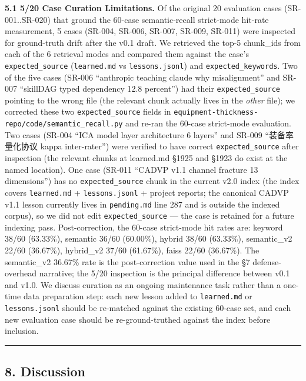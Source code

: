 \textbf{5.1 5/20 Case Curation Limitations.} Of the original 20
evaluation cases (SR-001..SR-020) that ground the 60-case
semantic-recall strict-mode hit-rate measurement, 5 cases (SR-004,
SR-006, SR-007, SR-009, SR-011) were inspected for ground-truth drift
after the v0.1 draft. We retrieved the top-5 chunk\_ids from each of the
6 retrieval modes and compared them against the case's
\texttt{expected\_source} (\texttt{learned.md} vs
\texttt{lessons.jsonl}) and \texttt{expected\_keywords}. Two of the five
cases (SR-006 ``anthropic teaching claude why misalignment'' and SR-007
``skillDAG typed dependency 12.8 percent'') had their
\texttt{expected\_source} pointing to the wrong file (the relevant chunk
actually lives in the \emph{other} file); we corrected these two
\texttt{expected\_source} fields in
\texttt{equipment-thickness-repo/code/semantic\_recall.py} and re-ran
the 60-case strict-mode evaluation. Two cases (SR-004 ``ICA model layer
architecture 6 layers'' and SR-009 ``装备率量化协议 kappa inter-rater'')
were verified to have correct \texttt{expected\_source} after inspection
(the relevant chunks at learned.md §1925 and §1923 do exist at the named
location). One case (SR-011 ``CADVP v1.1 channel fracture 13
dimensions'') has no \texttt{expected\_source} chunk in the current v2.0
index (the index covers \texttt{learned.md} + \texttt{lessons.jsonl} +
project reports; the canonical CADVP v1.1 lesson currently lives in
\texttt{pending.md} line 287 and is outside the indexed corpus), so we
did not edit \texttt{expected\_source} --- the case is retained for a
future indexing pass. Post-correction, the 60-case strict-mode hit rates
are: keyword 38/60 (63.33\%), semantic 36/60 (60.00\%), hybrid 38/60
(63.33\%), semantic\_v2 22/60 (36.67\%), hybrid\_v2 37/60 (61.67\%),
faiss 22/60 (36.67\%). The semantic\_v2 36.67\% rate is the
post-correction value used in the §7 defense-overhead narrative; the
5/20 inspection is the principal difference between v0.1 and v1.0. We
discuss curation as an ongoing maintenance task rather than a one-time
data preparation step: each new lesson added to \texttt{learned.md} or
\texttt{lessons.jsonl} should be re-matched against the existing 60-case
set, and each new evaluation case should be re-ground-truthed against
the index before inclusion.

\begin{center}\rule{0.5\linewidth}{0.5pt}\end{center}

\subsection{8. Discussion}\label{discussion}

